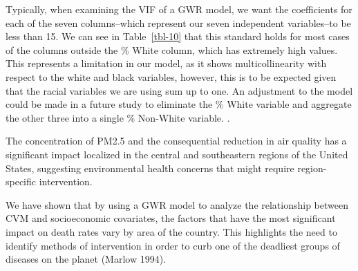 \documentclass[
]{article}
\begin{document}
\begin{table}

\caption{\label{tbl-10}}


\end{table}%

Typically, when examining the VIF of a GWR model, we want the
coefficients for each of the seven columns--which represent our seven
independent variables--to be less than 15. We can see in
Table~\ref{tbl-10} that this standard holds for most cases of the
columns outside the \% White column, which has extremely high values.
This represents a limitation in our model, as it shows multicollinearity
with respect to the white and black variables, however, this is to be
expected given that the racial variables we are using sum up to one. An
adjustment to the model could be made in a future study to eliminate the
\% White variable and aggregate the other three into a single \%
Non-White variable. .

The concentration of PM2.5 and the consequential reduction in air
quality has a significant impact localized in the central and
southeastern regions of the United States, suggesting environmental
health concerns that might require region-specific intervention.~

We have shown that by using a GWR model to analyze the relationship
between CVM and socioeconomic covariates, the factors that have the most
significant impact on death rates vary by area of the country. This
highlights the need to identify methods of intervention in order to curb
one of the deadliest groups of diseases on the planet (Marlow 1994).
\end{document}
